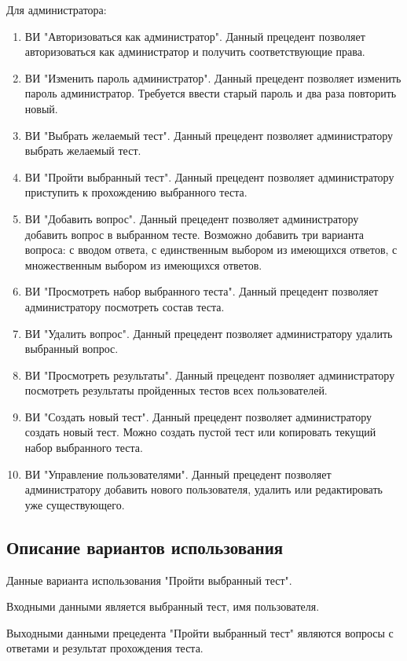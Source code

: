 Для администратора:
\begin{enumerate}
	\item ВИ "Авторизоваться как администратор". Данный прецедент позволяет авторизоваться как администратор и получить соответствующие права.
	\item ВИ "Изменить пароль администратор". Данный прецедент позволяет изменить пароль администратор. Требуется ввести старый пароль и два раза повторить новый.
	\item ВИ "Выбрать желаемый тест". Данный прецедент позволяет администратору выбрать желаемый тест.
	\item ВИ "Пройти выбранный тест". Данный прецедент позволяет администратору приступить к прохождению выбранного теста.
	\item ВИ "Добавить вопрос". Данный прецедент позволяет администратору добавить вопрос в выбранном тесте. Возможно добавить три варианта вопроса: с вводом ответа, с единственным выбором из имеющихся ответов, с множественным выбором из имеющихся ответов.
	\item ВИ "Просмотреть набор выбранного теста". Данный прецедент позволяет администратору посмотреть состав теста.
	\item ВИ "Удалить вопрос". Данный прецедент позволяет администратору удалить выбранный вопрос.
	\item ВИ "Просмотреть результаты". Данный прецедент позволяет администратору посмотреть результаты пройденных тестов всех пользователей.
	\item ВИ "Создать новый тест". Данный прецедент позволяет администратору создать новый тест. Можно создать пустой тест или копировать текущий набор выбранного теста.
	\item ВИ "Управление пользователями". Данный прецедент позволяет администратору добавить нового пользователя, удалить или редактировать уже существующего.
\end{enumerate}

\subsection{Описание вариантов использования}

Данные варианта использования "Пройти выбранный тест".

Входными данными является выбранный тест, имя пользователя.

Выходными данными прецедента "Пройти выбранный тест" являются вопросы с ответами и результат прохождения теста.


